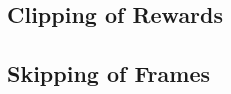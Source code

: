 	\subsection{Clipping of Rewards} %
		\label{sub:clipping_of_rewards}
	
	\subsection{Skipping of Frames} %
	\label{sub:skipping_of_frames}
	
